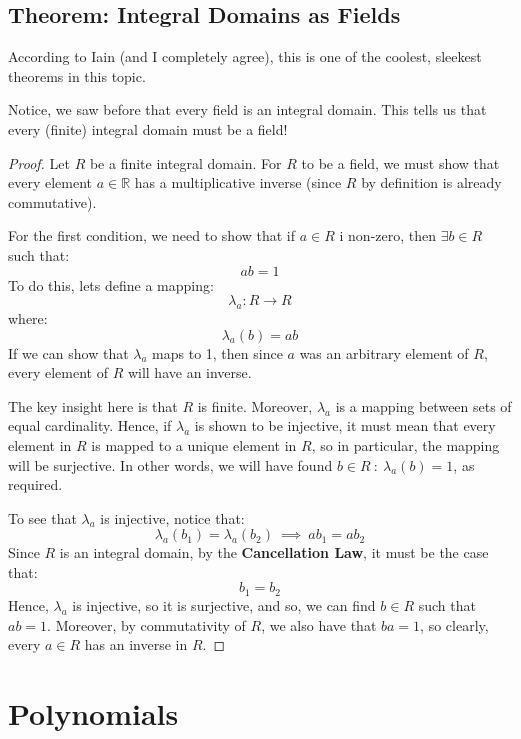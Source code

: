 \documentclass{exam}
\begin{document}
\subsection{Theorem: Integral Domains as Fields}

According to Iain (and I completely agree), this is one of the coolest, sleekest theorems in this topic.

\textbox{Every \textbf{finite} integral domain is a \textbf{field}. [Theorem 3.2.17}

Notice, we saw before that every field is an integral domain. This tells us that every (finite) integral domain must be a field!

\begin{proof}

Let $R$ be a finite integral domain. For $R$ to be a field, we must show that every element $a \in \mathbb{R}$ has a multiplicative inverse (since $R$ by definition is already commutative).

For the first condition, we need to show that if $a \in R$ i non-zero, then $\exists b \in R$ such that:
\[
ab = 1
\]
To do this, lets define a mapping:
\[
\lambda_a : R \to R
\]
where:
\[
\lambda_a(b) = ab
\]
If we can show that $\lambda_a$ maps to 1, then since $a$ was an arbitrary element of $R$, every element of $R$ will have an inverse.

The key insight here is that $R$ is finite. Moreover, $\lambda_a$ is a mapping between sets of equal cardinality. Hence, if $\lambda_a$ is shown to be injective, it must mean that every element in $R$ is mapped to a unique element in $R$, so in particular, the mapping will be surjective. In other words, we will have found $b \in R \ : \ \lambda_a(b) = 1$, as required.

\bigskip

To see that $\lambda_a$ is injective, notice that:
\[
\lambda_a(b_1) = \lambda_a(b_2) \ \implies \ ab_1 = ab_2
\]
Since $R$ is an integral domain, by the \textbf{Cancellation Law}, it must be the case that:
\[
b_1 = b_2
\]
Hence, $\lambda_a$ is injective, so it is surjective, and so, we can find $b \in R$ such that $ab = 1$. Moreover, by commutativity of $R$, we also have that $ba = 1$, so clearly, every $a \in R$ has an inverse in $R$.

\end{proof}

\section{Polynomials}
\end{document}
